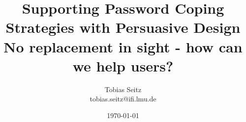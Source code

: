 

\newcommand{\mytitle}{Supporting Password Coping Strategies with Persuasive Design}
\newcommand{\mysubtitle}{No replacement in sight - how can we help users?}
\newcommand{\myname}{Tobias Seitz}
\newcommand{\ie}{i.e.,\ }
\newcommand{\eg}{e.g.,\ }

\author{\myname\\\small tobias.seitz@ifi.lmu.de}
\title{\mytitle\\
\mysubtitle\\}
\date{\today}




\newcommand{\statslt}[3]{\textit{F\textsubscript{#1}}~$=$~#2, \textit{p}~$<$~#3}
\newcommand{\stats}[3]{\textit{F\textsubscript{#1}}~$=$~#2, \textit{p}~$=$~#3}
\newcommand{\pval}[1]{\textit{p}~$=$~#1}
\newcommand{\pvallt}[1]{\textit{p}~$<$~#1}
\newcommand{\mean}[2]{\textit{m}~$=$~#1, \textit{sd}~$=$~#2}
\newcommand{\meant}[2]{\textit{m}$=$#1 \textit{sd}$=$#2}
\newcommand{\meanonly}[1]{\textit{m}~$=$~#1}
\newcommand{\median}[1]{\textit{median}~$=$~#1}
\newcommand*{\thead}[1]{\multicolumn{1}{c}{\bfseries #1}}

\label{Shortcuts}
\usepackage{xspace}
\newcommand{\percent}{\%\xspace}
\newcommand{\seefig}{see Figure\xspace}
\newcommand{\red}[1]{\textcolor{red}{#1}}
\newcommand{\access}[1]{\textit{(last accessed #1)}}
\newcommand{\average}{average:\xspace}
\newcommand{\etal}{et al.\xspace}
\newcommand{\todo}[1]{\textcolor{pinkaccent}{\textbf{@@@TODO} {#1}}\ }
\newcommand{\ar}{\textcolor{pinkaccent}{\textbf{@@@TODO Add Reference}}\ }

